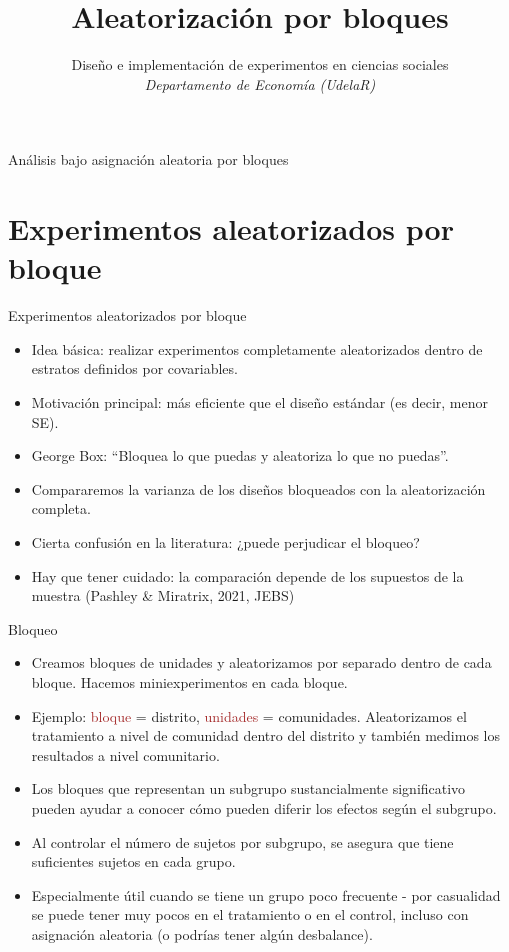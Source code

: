 \documentclass[
  ignorenonframetext,
]{beamer}
\title{Aleatorización por bloques}
\author{Diseño e implementación de experimentos en ciencias sociales\\
\emph{Departamento de Economía (UdelaR)}}
\date{}
\begin{document}
\frame{\titlepage}

\begin{frame}{Análisis bajo asignación aleatoria por bloques}
\protect\hypertarget{anuxe1lisis-bajo-asignaciuxf3n-aleatoria-por-bloques}{}
\end{frame}

\hypertarget{experimentos-aleatorizados-por-bloque}{%
\section{Experimentos aleatorizados por
bloque}\label{experimentos-aleatorizados-por-bloque}}

\begin{frame}{Experimentos aleatorizados por bloque}
\begin{itemize}
\item
  Idea básica: realizar experimentos completamente aleatorizados dentro
  de estratos definidos por covariables. \pause
\item
  Motivación principal: más eficiente que el diseño estándar (es decir,
  menor SE). \pause
\item
  George Box: ``Bloquea lo que puedas y aleatoriza lo que no puedas''.
  \pause
\item
  Compararemos la varianza de los diseños bloqueados con la
  aleatorización completa. \pause
\item
  Cierta confusión en la literatura: ¿puede perjudicar el bloqueo?
\item
  Hay que tener cuidado: la comparación depende de los supuestos de la
  muestra (Pashley \& Miratrix, 2021, JEBS)
\end{itemize}
\end{frame}

\begin{frame}{Bloqueo}
\protect\hypertarget{bloqueo}{}
\begin{itemize}
\item
  Creamos bloques de unidades y aleatorizamos por separado dentro de
  cada bloque. Hacemos miniexperimentos en cada bloque.
\item
  Ejemplo: \textcolor{brown}{bloque} = distrito,
  \textcolor{brown}{unidades} = comunidades. Aleatorizamos el
  tratamiento a nivel de comunidad dentro del distrito y también medimos
  los resultados a nivel comunitario.\pause
\item
  Los bloques que representan un subgrupo sustancialmente significativo
  pueden ayudar a conocer cómo pueden diferir los efectos según el
  subgrupo. \pause
\item
  Al controlar el número de sujetos por subgrupo, se asegura que tiene
  suficientes sujetos en cada grupo. \pause
\item
  Especialmente útil cuando se tiene un grupo poco frecuente - por
  casualidad se puede tener muy pocos en el tratamiento o en el control,
  incluso con asignación aleatoria (o podrías tener algún desbalance).
\end{itemize}
\end{frame}
\end{document}

